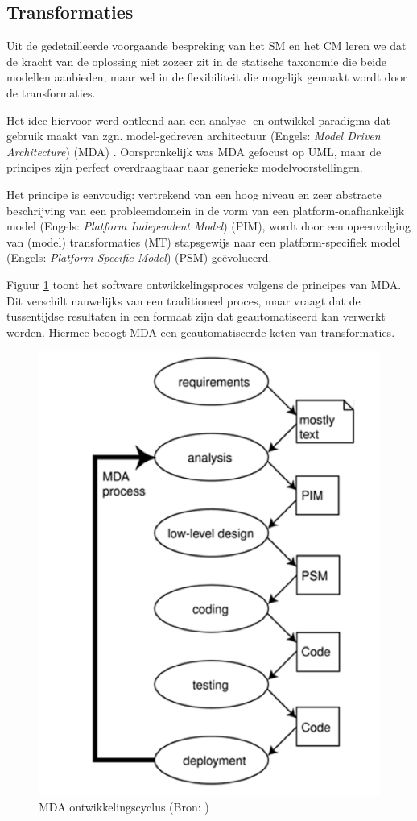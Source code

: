 
\subsection{Transformaties}
\label{subsection:devel-transformations}

Uit de gedetailleerde voorgaande bespreking van het SM en het CM leren we dat
de kracht van de oplossing niet zozeer zit in de statische taxonomie die beide
modellen aanbieden, maar wel in de flexibiliteit die mogelijk gemaakt wordt
door de transformaties.

Het idee hiervoor werd ontleend aan een analyse- en ontwikkel-paradigma dat
gebruik maakt van zgn. model-gedreven architectuur (Engels: \emph{Model Driven
Architecture}) (MDA) \citep{soley2000model,kleppe2003mda}. Oorspronkelijk was
MDA gefocust op UML, maar de principes zijn perfect overdraagbaar naar
generieke modelvoorstellingen.

Het principe is eenvoudig: vertrekend van een hoog niveau en zeer abstracte
beschrijving van een probleemdomein in de vorm van een platform-onafhankelijk
model (Engels: \emph{Platform Independent Model}) (PIM), wordt door een
opeenvolging van (model) transformaties (MT) stapsgewijs naar een
platform-specifiek model (Engels: \emph{Platform Specific Model}) (PSM)
ge\"evolueerd.

Figuur \ref{fig:mda} toont het software ontwikkelingsproces volgens de
principes van MDA. Dit verschilt nauwelijks van een traditioneel proces, maar
vraagt dat de tussentijdse resultaten in een formaat zijn dat geautomatiseerd
kan verwerkt worden. Hiermee beoogt MDA een geautomatiseerde keten van
transformaties.

\begin{figure}[ht]
  \centering
  \includegraphics[width=0.4\linewidth]{resources/mda.png}
  \caption[MDA ontwikkelingscyclus]{MDA ontwikkelingscyclus (Bron: \citep{kleppe2003mda})}
  \label{fig:mda}
\end{figure}

